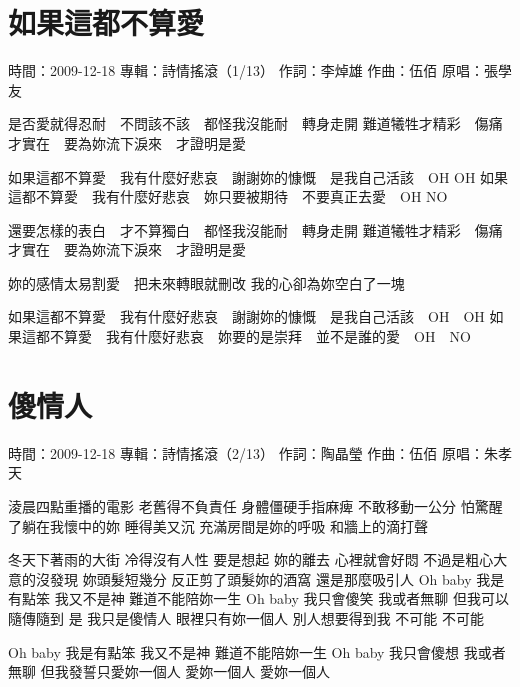 \documentclass[UTF8,a4paper,oneside,twocolumn,12pt]{ctexbook}
\newcommand{\infopair}[2]{\textbullet #1：#2}
\newcommand{\zc}[1][伍佰]{\infopair{作詞}{#1}}
\newcommand{\zq}[1][伍佰]{\infopair{作曲}{#1}}
\newcommand{\zj}[1]{\infopair{專輯}{#1}}
\newcommand{\yc}[1]{\infopair{原唱}{#1}}
\newcommand{\sj}[1]{\infopair{時間}{#1}}
\newenvironment{info}{\begin{flushleft}\kaishu
	}
	{\end{flushleft}\normalsize\yahei\par}
\newenvironment{lyric}{
	}
{}
\begin{document}
\section{如果這都不算愛}
\begin{info}
	\sj{2009-12-18}
	\zj{詩情搖滾（1/13）}
	\zc[李焯雄]
	\zq
	\yc{張學友}
\end{info}
\begin{lyric}
	是否愛就得忍耐　不問該不該　都怪我沒能耐　轉身走開
	難道犧牲才精彩　傷痛才實在　要為妳流下淚來　才證明是愛

	如果這都不算愛　我有什麼好悲哀　謝謝妳的慷慨　是我自己活該　OH OH
	如果這都不算愛　我有什麼好悲哀　妳只要被期待　不要真正去愛　OH NO

	還要怎樣的表白　才不算獨白　都怪我沒能耐　轉身走開
	難道犧牲才精彩　傷痛才實在　要為妳流下淚來　才證明是愛

	妳的感情太易割愛　把未來轉眼就刪改
	我的心卻為妳空白了一塊

	如果這都不算愛　我有什麼好悲哀　謝謝妳的慷慨　是我自己活該　OH　OH
	如果這都不算愛　我有什麼好悲哀　妳要的是崇拜　並不是誰的愛　OH　NO
\end{lyric}

\section{傻情人}
\begin{info}
	\sj{2009-12-18}
	\zj{詩情搖滾（2/13）}
	\zc[陶晶瑩]
	\zq
	\yc{朱孝天}
\end{info}
\begin{lyric}
	淩晨四點重播的電影 老舊得不負責任
	身體僵硬手指麻痺 不敢移動一公分
	怕驚醒了躺在我懷中的妳 睡得美又沉
	充滿房間是妳的呼吸 和牆上的滴打聲

	冬天下著雨的大街 冷得沒有人性
	要是想起 妳的離去 心裡就會好悶
	不過是粗心大意的沒發現 妳頭髮短幾分
	反正剪了頭髮妳的酒窩 還是那麼吸引人
	Oh baby 我是有點笨 我又不是神
	難道不能陪妳一生
	Oh baby 我只會傻笑 我或者無聊
	但我可以隨傳隨到
	是 我只是傻情人 眼裡只有妳一個人
	別人想要得到我 不可能 不可能

	Oh baby 我是有點笨 我又不是神
	難道不能陪妳一生
	Oh baby 我只會傻想 我或者無聊
	但我發誓只愛妳一個人 愛妳一個人 愛妳一個人
\end{lyric}
\end{document}
